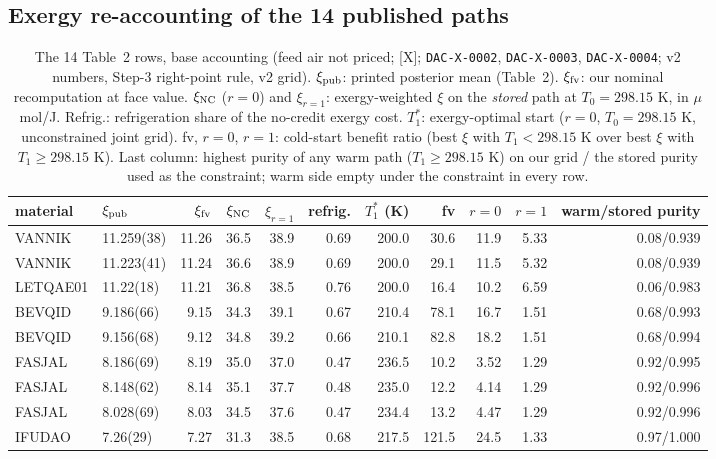 \documentclass[10pt]{article}
\newcommand{\tier}[1]{\textsf{[#1]}}
\newcommand{\tX}{\tier{X}}
\newcommand{\id}[1]{\texttt{DAC-#1}}
\newcommand{\umolJ}{\ensuremath{\mu}mol/J}
\begin{document}
\subsection{Exergy re-accounting of the 14 published paths}
\begin{table}[h]\centering\footnotesize
\caption{The 14 Table~2 rows, base accounting (feed air not priced; \tX; \id{X-0002}, \id{X-0003}, \id{X-0004}; v2 numbers, Step-3 right-point rule, v2 grid). $\xi_{\rm pub}$: printed posterior mean (Table~2). $\xi_{\rm fv}$: our nominal recomputation at face value. $\xi_{\rm NC}$ ($r=0$) and $\xi_{r=1}$: exergy-weighted $\xi$ on the \emph{stored} path at $T_0=298.15$ K, in \umolJ{}. Refrig.: refrigeration share of the no-credit exergy cost. $T_1^\ast$: exergy-optimal start ($r=0$, $T_0=298.15$ K, unconstrained joint grid). fv, $r{=}0$, $r{=}1$: cold-start benefit ratio (best $\xi$ with $T_1<298.15$ K over best $\xi$ with $T_1\ge298.15$ K). Last column: highest purity of any warm path ($T_1\ge298.15$ K) on our grid / the stored purity used as the constraint; warm side empty under the constraint in every row.}
\begin{tabular}{llrrrrrrrrr}\toprule
material & $\xi_{\rm pub}$ & $\xi_{\rm fv}$ & $\xi_{\rm NC}$ & $\xi_{r=1}$ & refrig. & $T_1^\ast$ (K) & fv & $r{=}0$ & $r{=}1$ & warm/stored purity\\\midrule
VANNIK & 11.259(38) & 11.26 & 36.5 & 38.9 & 0.69 & 200.0 & 30.6 & 11.9 & 5.33 & 0.08/0.939\\
VANNIK & 11.223(41) & 11.24 & 36.6 & 38.9 & 0.69 & 200.0 & 29.1 & 11.5 & 5.32 & 0.08/0.939\\
LETQAE01 & 11.22(18) & 11.21 & 36.8 & 38.5 & 0.76 & 200.0 & 16.4 & 10.2 & 6.59 & 0.06/0.983\\
BEVQID & 9.186(66) & 9.15 & 34.3 & 39.1 & 0.67 & 210.4 & 78.1 & 16.7 & 1.51 & 0.68/0.993\\
BEVQID & 9.156(68) & 9.12 & 34.8 & 39.2 & 0.66 & 210.1 & 82.8 & 18.2 & 1.51 & 0.68/0.994\\
FASJAL & 8.186(69) & 8.19 & 35.0 & 37.0 & 0.47 & 236.5 & 10.2 & 3.52 & 1.29 & 0.92/0.995\\
FASJAL & 8.148(62) & 8.14 & 35.1 & 37.7 & 0.48 & 235.0 & 12.2 & 4.14 & 1.29 & 0.92/0.996\\
FASJAL & 8.028(69) & 8.03 & 34.5 & 37.6 & 0.47 & 234.4 & 13.2 & 4.47 & 1.29 & 0.92/0.996\\
IFUDAO & 7.26(29) & 7.27 & 31.3 & 38.5 & 0.68 & 217.5 & 121.5 & 24.5 & 1.33 & 0.97/1.000\\

\end{tabular}
\end{table}
\end{document}
